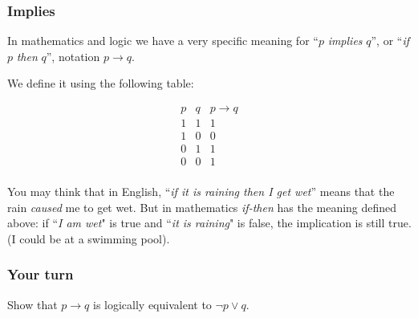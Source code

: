 \documentclass[10pt]{beamer}
\newcommand{\ra}{\to} %
\theoremstyle{definition}
\begin{document}
\begin{frame}
\frametitle{Implies}



In mathematics and logic we have a very specific meaning for ``$p$ {\em implies} $q$'', or ``{\em if} $p$ {\em then} $q$'', notation $p\ra q$.

\bigskip
We define it using the following table:

$$\begin{array}{c|c|ccc}
 p & q &  p\ra q\\
 \hline
 1 & 1 &  1\\
 1 & 0 &  0\\
 0& 1  &  1\\
 0 & 0 &  1\\
\end{array}$$

\bigskip\pause 
You may think that in English, ``{\em if it is raining then I get wet}'' means that the rain {\em caused} me to get wet. But in mathematics {\em if-then} has the meaning defined above: if ``{\em I am wet}" is true and ``{\em it is raining}" is false, the implication is still true.  (I could be  at a swimming pool).

\vspace{2cm}
\vfill
\end{frame}



\begin{frame}
\frametitle{Your turn}

Show that $p\ra q$ is  logically equivalent to $\neg p\vee q$.
%
%

\vspace{4cm}
\vfill
\end{frame}
\end{document}
